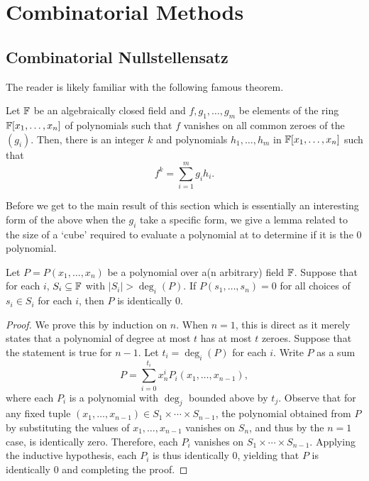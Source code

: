 \section{Combinatorial Methods}

\subsection{Combinatorial Nullstellensatz}

	The reader is likely familiar with the following famous theorem.

	\begin{ftheo}
		Let $\mathbb{F}$ be an algebraically closed field and $f,g_1,\ldots,g_m$ be elements of the ring $\mathbb{F}[x_1,\ldots,x_n]$ of polynomials such that $f$ vanishes on all common zeroes of the $(g_i)$. Then, there is an integer $k$ and polynomials $h_1,\ldots,h_m$ in $\mathbb{F}[x_1,\ldots,x_n]$ such that
		\[ f^k = \sum_{i=1}^{m} g_i h_i. \]
	\end{ftheo}

	Before we get to the main result of this section which is essentially an interesting form of the above when the $g_i$ take a specific form, we give a lemma related to the size of a `cube' required to evaluate a polynomial at to determine if it is the $0$ polynomial.

	\begin{lemma}
		\label{lem: comb null lem}
		Let $P = P(x_1,\ldots,x_n)$ be a polynomial over a(n arbitrary) field $\mathbb{F}$. Suppose that for each $i$, $S_i \subseteq \mathbb{F}$ with $|S_i| > \deg_i(P)$. If $P(s_1,\ldots,s_n) = 0$ for all choices of $s_i \in S_i$ for each $i$, then $P$ is identically $0$. 
	\end{lemma}
	\begin{proof}
		We prove this by induction on $n$. When $n=1$, this is direct as it merely states that a polynomial of degree at most $t$ has at most $t$ zeroes. Suppose that the statement is true for $n-1$. Let $t_i = \deg_i(P)$ for each $i$. Write $P$ as a sum
		\[ P = \sum_{i=0}^{t_i} x_n^i P_i(x_1,\ldots,x_{n-1}), \]
		where each $P_i$ is a polynomial with $\deg_j$ bounded above by $t_j$. Observe that for any fixed tuple $(x_1,\ldots,x_{n-1}) \in S_1 \times \cdots \times S_{n-1}$, the polynomial obtained from $P$ by substituting the values of $x_1,\ldots,x_{n-1}$ vanishes on $S_n$, and thus by the $n=1$ case, is identically zero. Therefore, each $P_i$ vanishes on $S_1 \times \cdots \times S_{n-1}$. Applying the inductive hypothesis, each $P_i$ is thus identically $0$, yielding that $P$ is identically $0$ and completing the proof.
	\end{proof}

